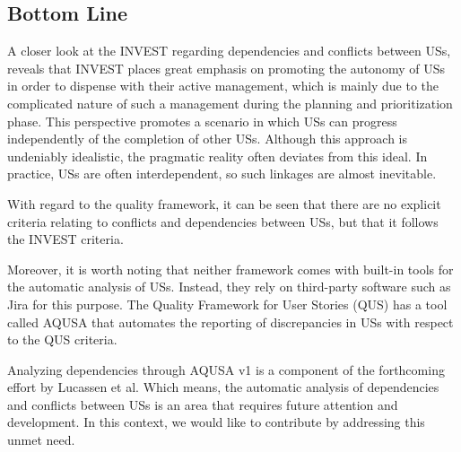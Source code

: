\subsection{Bottom Line} \label{usq_conclusion}
A closer look at the INVEST regarding dependencies and conflicts between USs, reveals that INVEST places great emphasis on promoting the autonomy of USs in order to dispense with their active management, which is mainly due to the complicated nature of such a management during the planning and prioritization phase. This perspective promotes a scenario in which USs can progress independently of the completion of other USs. Although this approach is undeniably idealistic, the pragmatic reality often deviates from this ideal. In practice, USs are often interdependent, so such linkages are almost inevitable. 

With regard to the quality framework, it can be seen that there are no explicit criteria relating to conflicts and dependencies between USs, but that it follows the INVEST criteria.

Moreover, it is worth noting that neither framework comes with built-in tools for the automatic analysis of USs. Instead, they rely on third-party software such as Jira for this purpose. The Quality Framework for User Stories (QUS) has a tool called AQUSA that automates the reporting of discrepancies in USs with respect to the QUS criteria. 

Analyzing dependencies through AQUSA v1 is a component of the forthcoming effort by Lucassen et al. Which means, the automatic analysis of dependencies and conflicts between USs is an area that requires future attention and development. In this context, we would like to contribute by addressing this unmet need.
